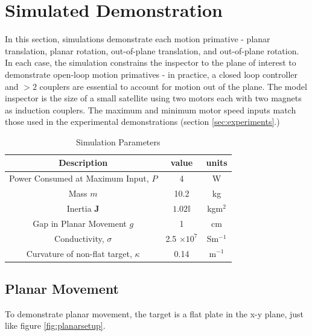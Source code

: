 \documentclass[letterpaper, 10 pt, conference]{ieeeconf}  %
\begin{document}
\section{Simulated Demonstration}\label{sec:simulations}

In this section, simulations demonstrate each motion primative - planar translation, planar rotation, out-of-plane translation, and out-of-plane rotation. In each case, the simulation constrains the inspector to the plane of interest to demonstrate open-loop motion primatives - in practice, a closed loop controller and $>2$ couplers are essential to account for motion out of the plane. The model inspector is the size of a small satellite using two motors each with two magnets as induction couplers. The maximum and minimum motor speed inputs match those used in the experimental demonstrations (section \ref{sec:experiments}.)     

\begin{table}[h]
\caption{Simulation Parameters}
\label{table: sim_params}
\begin{center}
\begin{tabular}{| c | c | c |}
\hline
Description & value & units \\
\hline \hline
Power Consumed at Maximum Input, $P$ & 4 & W \\ \hline

Mass $m$ & 10.2 & kg \\ \hline

Inertia $\textbf{J}$ & $1.02 \mathbb{I}$ & kgm$^2$ \\ \hline

Gap in Planar Movement $g$ & 1 & cm \\ \hline

Conductivity, $\sigma$ & 2.5 $\times 10^7$ & Sm$^{-1}$ \\ \hline

Curvature of non-flat target, $\kappa$  & 0.14 & m$^{-1}$\\

\hline
\end{tabular}
\end{center}
\end{table}

\subsection{Planar Movement}\label{sec:planar_movement_sim}
To demonstrate planar movement, the target is a flat plate in the x-y plane, just like figure \ref{fig:planarsetup}. 
  
\end{document}
